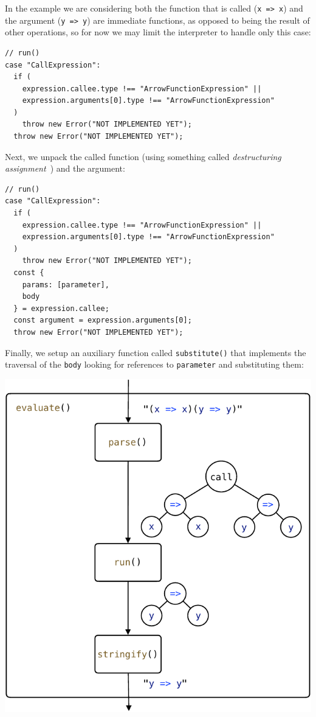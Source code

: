 \documentclass[12pt, oneside]{book}
\begin{document}
In the example we are considering both the function that is called (\texttt{x => x}) and the argument (\texttt{y => y}) are immediate functions, as opposed to being the result of other operations, so for now we may limit the interpreter to handle only this case:

\begin{verbatim}
// run()
case "CallExpression":
  if (
    expression.callee.type !== "ArrowFunctionExpression" ||
    expression.arguments[0].type !== "ArrowFunctionExpression"
  )
    throw new Error("NOT IMPLEMENTED YET");
  throw new Error("NOT IMPLEMENTED YET");
\end{verbatim}

Next, we unpack the called function (using something called \emph{destructuring assignment}~\cite{destructuring-assignment}) and the argument:

\begin{verbatim}
// run()
case "CallExpression":
  if (
    expression.callee.type !== "ArrowFunctionExpression" ||
    expression.arguments[0].type !== "ArrowFunctionExpression"
  )
    throw new Error("NOT IMPLEMENTED YET");
  const {
    params: [parameter],
    body
  } = expression.callee;
  const argument = expression.arguments[0];
  throw new Error("NOT IMPLEMENTED YET");
\end{verbatim}

Finally, we setup an auxiliary function called \texttt{substitute()} that implements the traversal of the \texttt{body} looking for references to \texttt{parameter} and substituting them:

\begin{center}
\includegraphics[page = 4]{images.pdf}
\end{center}
\end{document}
